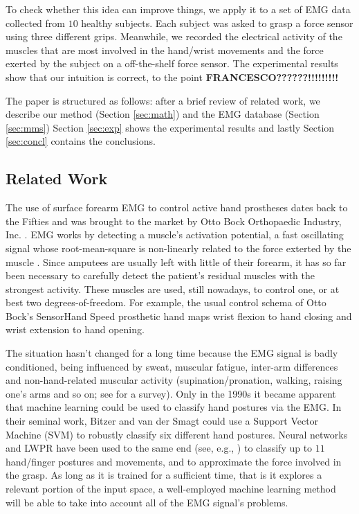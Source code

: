 To check whether this idea can improve things, we apply it to a set of
EMG data collected from $10$ healthy subjects. Each subject was asked
to grasp a force sensor 
using three
different grips. Meanwhile, we recorded the electrical activity of the
muscles that are most involved in the hand/wrist movements and the
force exerted by the subject on a off-the-shelf force sensor. The
experimental results show that our intuition is correct, to the point
{\bf FRANCESCO??????!!!!!!!!!}

The paper is structured as follows: after a brief review of related
work, 
we describe our method (Section \ref{sec:math}) and the EMG database
(Section \ref{sec:mms}) %
Section \ref{sec:exp}
shows the experimental results and lastly Section \ref{sec:concl}
contains the conclusions.

\subsection{Related Work}

The use of surface forearm EMG to control active hand prostheses dates
back to the Fifties and was brought to the market by Otto Bock
Orthopaedic Industry, Inc. \cite{history}. EMG works by detecting a
muscle's activation potential, a fast oscillating signal whose
root-mean-square is non-linearly related to the force exterted by the
muscle \cite{deluca}. Since amputees are usually left with little of
their forearm, it has so far been necessary to carefully detect the
patient's residual muscles with the strongest activity. These muscles
are used, still nowadays, to control one, or at best two
degrees-of-freedom. For example, the usual control schema of Otto
Bock's SensorHand Speed prosthetic hand maps wrist flexion to hand
closing and wrist extension to hand opening.

The situation hasn't changed for a long time because the EMG signal is
badly conditioned, being influenced by sweat, muscular fatigue,
inter-arm differences and non-hand-related muscular activity
(supination/pronation, walking, raising one's arms and so on; see
\cite{zecca} for a survey). Only in the 1990s it became apparent that
machine learning could be used to classify hand postures via the
EMG. In their seminal work, Bitzer and van der Smagt \cite{smagt}
could use a Support Vector Machine (SVM) to robustly classify six different
hand postures. Neural networks and LWPR \cite{lwpr} have been used to
the same end (see, e.g., \cite{2008.ICRA,2008.BioCyb,Sebelius2005}) to
classify up to $11$ hand/finger postures and movements, and to
approximate the force involved in the grasp. As long as it is trained
for a sufficient time, that is it explores a relevant portion of the
input space, a well-employed machine learning method will be able to
take into account all of the EMG signal's problems.

